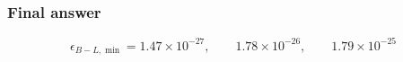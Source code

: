\subsubsection*{Final answer}
{\color{blue}
\begin{equation*}
\boxed{\;\epsilon_{B-L,\min}=1.47\times10^{-27},\qquad 1.78\times10^{-26},\qquad 1.79\times10^{-25}\;}
\end{equation*}
}
